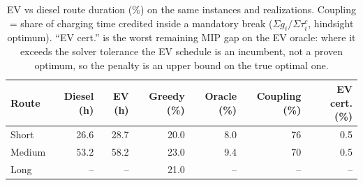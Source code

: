 \begin{table}[ht]\centering
\caption{EV vs diesel route duration (\%) on the same instances and realizations.  Coupling = share of charging time credited inside a mandatory break ($\Sigma g_i/\Sigma\tau^c_i$, hindsight optimum). ``EV cert.'' is the worst remaining MIP gap on the EV oracle: where it exceeds the solver tolerance the EV schedule is an incumbent, not a proven optimum, so the penalty is an upper bound on the true optimal one.}
\label{tab:diesel}
\begin{tabular}{lrrrrrr}
\hline
Route & Diesel (h) & EV (h) & Greedy (\%) & Oracle (\%) & Coupling (\%) & EV cert. (\%) \\
\hline
Short & 26.6 & 28.7 & 20.0 & 8.0 & 76 & 0.5 \\
Medium & 53.2 & 58.2 & 23.0 & 9.4 & 70 & 0.5 \\
Long & -- & -- & 21.0 & -- & -- & -- \\
\hline
\end{tabular}
\end{table}
